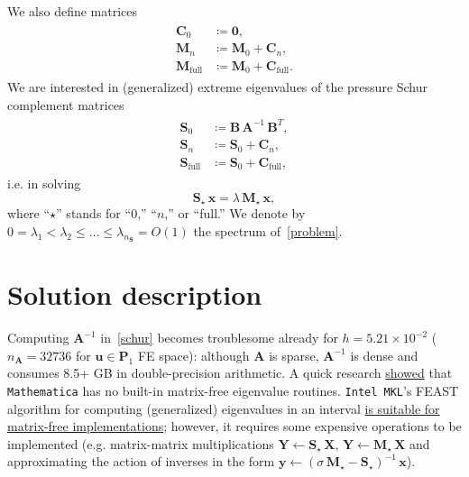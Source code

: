\documentclass[12pt]{article}
\newcommand{\vect}[1]{\boldsymbol{\mathbf{#1}}}
\begin{document}
We also define matrices 
\begin{align}\begin{split}
	\vect C_0 &\coloneqq \vect 0,\\
	\vect M_n &\coloneqq \vect M_0 + \vect C_n,\\
	\vect M_{\text{full}} &\coloneqq \vect M_0 + \vect C_{\text{full}}.
\end{split}\end{align}
We are interested in (generalized) extreme eigenvalues of the pressure Schur complement matrices
\begin{align}\label{schur}\begin{split}
	\vect S_0 &\coloneqq \vect B\,\vect A^{-1}\,\vect B^{T},\\
	\vect S_n &\coloneqq \vect S_0 + \vect C_n,\\
	\vect S_{\text{full}} &\coloneqq \vect S_0 + \vect C_{\text{full}},
\end{split}\end{align}
i.e. in solving
\begin{equation}\label{problem}
	\vect S_\star\,\vect x = \lambda\,\vect M_\star\,\vect x,
\end{equation}
where ``$\star$'' stands for ``$0$,'' ``$n$,'' or ``full.'' We denote by~$0 = \lambda_1 < \lambda_2 \le \dots \le \lambda_{n_{\vect S}} = O(1)$ the spectrum of~\eqref{problem}.

\section{Solution description}

Computing $\vect A^{-1}$ in~\eqref{schur} becomes troublesome already for $h = 5.21\times10^{-2}$ ($n_{\vect A} = 32736$ for $\vect u \in \vect P_1$ FE space): although $\vect A$ is sparse, $\vect A^{-1}$ is dense and consumes 8.5+ GB in double-precision arithmetic. A quick research \href{https://mathematica.stackexchange.com/questions/189620/matrix-free-arnoldi-method-for-eigensystems}{showed} that \texttt{Mathematica} has no built-in matrix-free eigenvalue routines. \texttt{Intel MKL}'s FEAST algorithm for computing (generalized) eigenvalues in an interval \href{https://software.intel.com/sites/default/files/mkl-2019-developer-reference-c.pdf#_OPENTOPIC_TOC_PROCESSING_d62e853651}{is suitable for matrix-free implementations}; however, it requires some expensive operations to be implemented (e.g. matrix-matrix multiplications $\vect Y \leftarrow \vect S_\star\,\vect X$, $\vect Y \leftarrow \vect M_\star\,\vect X$ and approximating the action of inverses in the form $\vect y \leftarrow (\sigma\,\vect M_\star - \vect S_\star)^{-1}\,\vect x$).
\end{document}
